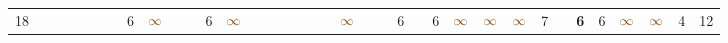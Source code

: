 \begin{landscape}
\begin{table}
\begin{adjustwidth}{-2.6cm}{}
{\begin{tabular}{l|lllllllllllllllllllllllllllllllll|ll}
		18   &            &                                                                 &                                                                 &                                                                 &                                                                 &                                                                 & 6                                                               & $\textcolor[rgb]{0.541,0.29,0.043}{\infty}$ &                                                                 &                                                                 & 6                                                               & $\textcolor[rgb]{0.541,0.29,0.043}{\infty}$ &                                                                 &                                                                 &                                                                 &                                                                 &                                                                 &                                                                 & $\textcolor[rgb]{0.541,0.29,0.043}{\infty}$ &                                                                 &                                                                 & 6                                                               &                                                                 & 6                                                               & $\textcolor[rgb]{0.541,0.29,0.043}{\infty}$ & $\textcolor[rgb]{0.541,0.29,0.043}{\infty}$ & $\textcolor[rgb]{0.541,0.29,0.043}{\infty}$ & 7                                                               &                                                                 & \textbf{6}                                                      & 6                                                               & $\textcolor[rgb]{0.541,0.29,0.043}{\infty}$ & $\textcolor[rgb]{0.541,0.29,0.043}{\infty}$ & 4          & 12          \\

\end{tabular}}
\end{adjustwidth}
\end{table}
\end{landscape}
